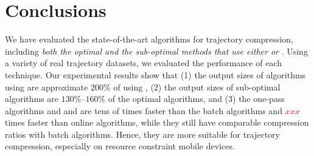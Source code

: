\vspace{-1ex}
\section{Conclusions}

We have evaluated the state-of-the-art \lsa algorithms for trajectory compression, including \emph{both the optimal and the sub-optimal methods that use either \ped or \sed}. 
Using a variety of real trajectory datasets, we evaluated the performance of each technique. %
Our experimental results show that 
(1) the output sizes of algorithms using \sed are approximate $200\%$ of using \ped, 
(2) the output sizes of sub-optimal algorithms are $130\%$--$160\%$ of the optimal algorithms, and 
(3) the one-pass algorithms \siped and \operb and \cised are tens of times faster than the batch algorithms and \textcolor{red}{$xxx$} times faster than online algorithms, while they still have comparable compression ratios with batch algorithms. Hence, they are more suitable for trajectory compression, especially on resource constraint mobile devices.
